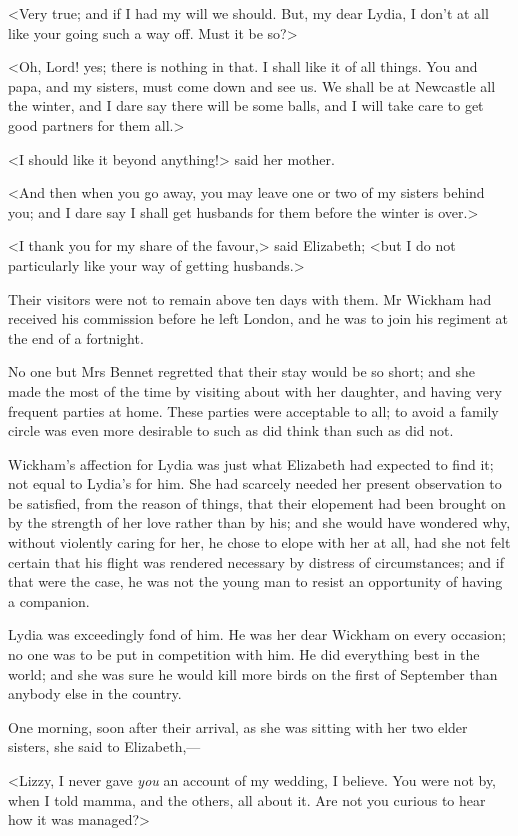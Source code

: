 <Very true; and if I had my will we should. But, my dear Lydia, I don't at all like your going such a way off. Must it be so?>

<Oh, Lord! yes; there is nothing in that. I shall like it of all things. You and papa, and my sisters, must come down and see us. We shall be at Newcastle all the winter, and I dare say there will be some balls, and I will take care to get good partners for them all.>

<I should like it beyond anything!> said her mother.

<And then when you go away, you may leave one or two of my sisters behind you; and I dare say I shall get husbands for them before the winter is over.>

<I thank you for my share of the favour,> said Elizabeth; <but I do not particularly like your way of getting husbands.>

Their visitors were not to remain above ten days with them. Mr Wickham had received his commission before he left London, and he was to join his regiment at the end of a fortnight.

No one but Mrs Bennet regretted that their stay would be so short; and she made the most of the time by visiting about with her daughter, and having very frequent parties at home. These parties were acceptable to all; to avoid a family circle was even more desirable to such as did think than such as did not.

Wickham's affection for Lydia was just what Elizabeth had expected to find it; not equal to Lydia's for him. She had scarcely needed her present observation to be satisfied, from the reason of things, that their elopement had been brought on by the strength of her love rather than by his; and she would have wondered why, without violently caring for her, he chose to elope with her at all, had she not felt certain that his flight was rendered necessary by distress of circumstances; and if that were the case, he was not the young man to resist an opportunity of having a companion.

Lydia was exceedingly fond of him. He was her dear Wickham on every occasion; no one was to be put in competition with him. He did everything best in the world; and she was sure he would kill more birds on the first of September than anybody else in the country.

One morning, soon after their arrival, as she was sitting with her two elder sisters, she said to Elizabeth,—

<Lizzy, I never gave \textit{you} an account of my wedding, I believe. You were not by, when I told mamma, and the others, all about it. Are not you curious to hear how it was managed?>

